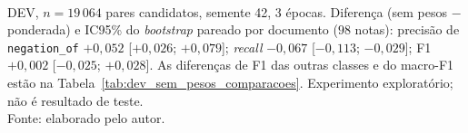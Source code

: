 \begin{table}[htbp]
  \centering
  \caption{Pair-Aware Linear com o BioBERTpt-all no DEV, com e sem ponderação de classes na perda.}
  \label{tab:dev_sem_pesos}
  \small\setlength{\tabcolsep}{4pt}
\\[2pt]
  {\footnotesize DEV, $n=19\,064$ pares candidatos, semente 42, 3 épocas. Diferença (sem pesos $-$ ponderada) e IC95\% do \emph{bootstrap} pareado por documento ($98$ notas): precisão de \texttt{negation\_of} $+0{,}052$ [$+0{,}026$; $+0{,}079$]; \emph{recall} $-0{,}067$ [$-0{,}113$; $-0{,}029$]; F1 $+0{,}002$ [$-0{,}025$; $+0{,}028$]. As diferenças de F1 das outras classes e do macro-F1 estão na Tabela~\ref{tab:dev_sem_pesos_comparacoes}. Experimento exploratório; não é resultado de teste.}\\[4pt]
  {\footnotesize Fonte: elaborado pelo autor.}
\end{table}

